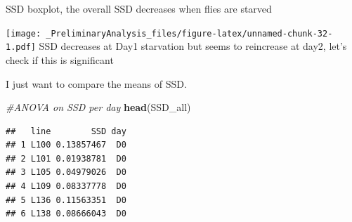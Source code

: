 \documentclass[
]{article}
\newenvironment{Shaded}{\begin{snugshade}}{\end{snugshade}}
\newcommand{\CommentTok}[1]{\textcolor[rgb]{0.56,0.35,0.01}{\textit{#1}}}
\newcommand{\DataTypeTok}[1]{\textcolor[rgb]{0.13,0.29,0.53}{#1}}
\newcommand{\DecValTok}[1]{\textcolor[rgb]{0.00,0.00,0.81}{#1}}
\newcommand{\FloatTok}[1]{\textcolor[rgb]{0.00,0.00,0.81}{#1}}
\newcommand{\KeywordTok}[1]{\textcolor[rgb]{0.13,0.29,0.53}{\textbf{#1}}}
\newcommand{\NormalTok}[1]{#1}
\newcommand{\OperatorTok}[1]{\textcolor[rgb]{0.81,0.36,0.00}{\textbf{#1}}}
\newcommand{\OtherTok}[1]{\textcolor[rgb]{0.56,0.35,0.01}{#1}}
\newcommand{\StringTok}[1]{\textcolor[rgb]{0.31,0.60,0.02}{#1}}
\begin{document}
SSD boxplot, the overall SSD decreases when flies are starved

\begin{Shaded}
\end{Shaded}

\texttt{[image: \_PreliminaryAnalysis\_files/figure-latex/unnamed-chunk-32-1.pdf]}
SSD decreases at Day1 starvation but seems to reincrease at day2, let's
check if this is significant

I just want to compare the means of SSD.

\begin{Shaded}
\begin{Highlighting}[]
\CommentTok{#ANOVA on SSD per day}
\KeywordTok{head}\NormalTok{(SSD_all)}
\end{Highlighting}
\end{Shaded}

\begin{verbatim}
##   line        SSD day
## 1 L100 0.13857467  D0
## 2 L101 0.01938781  D0
## 3 L105 0.04979026  D0
## 4 L109 0.08337778  D0
## 5 L136 0.11563351  D0
## 6 L138 0.08666043  D0
\end{verbatim}
\end{document}
